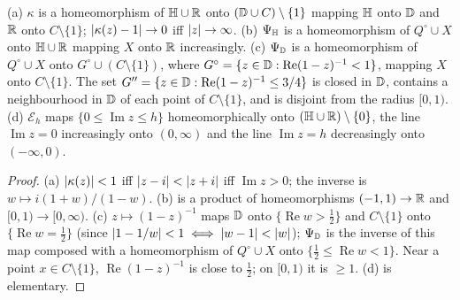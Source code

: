 \begin{lemma}[charts]\label{lem:charts}
(a) $\kappa$ is a homeomorphism of $\mathbb{H}\cup\mathbb{R}$ onto $(\mathbb{D}\cup C)\setminus\{1\}$ mapping $\mathbb{H}$ onto $\mathbb{D}$
and $\mathbb{R}$ onto $C\setminus\{1\}$; $\lvert \kappa(z)-1\rvert\to0$ iff $\lvert z\rvert\to\infty$.
(b) $\Psi_{\mathbb{H}}$ is a homeomorphism of $Q^\circ\cup X$ onto $\mathbb{H}\cup\mathbb{R}$ mapping $X$ onto $\mathbb{R}$
increasingly.
(c) $\Psi_{\mathbb{D}}$ is a homeomorphism of $Q^\circ\cup X$ onto $G^\circ\cup(C\setminus\{1\})$, where
$G^\circ=\{z\in\mathbb{D}:\operatorname{Re}(1-z)^{-1}<1\}$, mapping $X$ onto $C\setminus\{1\}$. The set
$G''=\{z\in\mathbb{D}:\operatorname{Re}(1-z)^{-1}\le3/4\}$ is closed in $\mathbb{D}$, contains a neighbourhood in $\mathbb{D}$
of each point of $C\setminus\{1\}$, and is disjoint from the radius $[0,1)$.
(d) $\mathcal E_h$ maps $\{0\le\operatorname{Im}z\le h\}$ homeomorphically onto
$(\mathbb{H}\cup\mathbb{R})\setminus\{0\}$, the line $\operatorname{Im}z=0$ increasingly onto $(0,\infty)$ and the line
$\operatorname{Im}z=h$ decreasingly onto $(-\infty,0)$.
\end{lemma}
\begin{proof}
(a) $\lvert \kappa(z)\rvert<1$ iff $\lvert z-i\rvert<\lvert z+i\rvert$ iff $\operatorname{Im}z>0$; the inverse is
$w\mapsto i(1+w)/(1-w)$. (b) is a product of homeomorphisms $(-1,1)\to\mathbb{R}$ and $[0,1)\to[0,\infty)$.
(c) $z\mapsto(1-z)^{-1}$ maps $\mathbb{D}$ onto $\{\operatorname{Re}w>\frac12\}$ and $C\setminus\{1\}$ onto
$\{\operatorname{Re}w=\frac12\}$ (since $\lvert 1-1/w\rvert<1\iff\lvert w-1\rvert<\lvert w\rvert$); $\Psi_{\mathbb{D}}$ is the inverse
of this map composed with a homeomorphism of $Q^\circ\cup X$ onto $\{\frac12\le\operatorname{Re}w<1\}$.
Near a point $x\in C\setminus\{1\}$, $\operatorname{Re}(1-z)^{-1}$ is close to $\frac12$; on $[0,1)$ it is
$\ge1$. (d) is elementary.
\end{proof}

